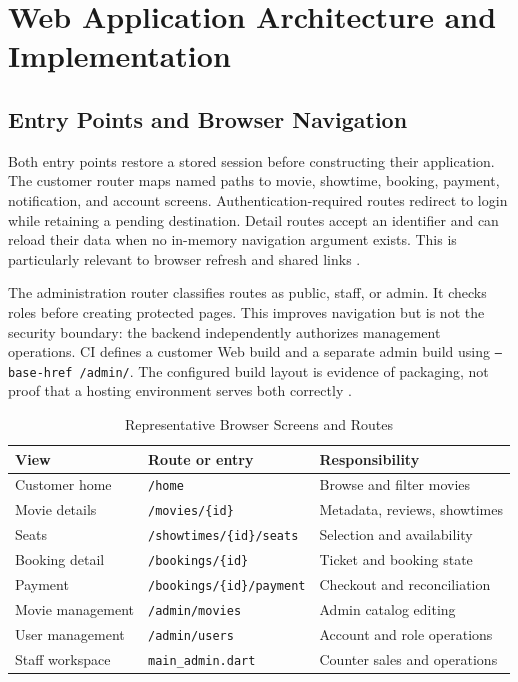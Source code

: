 \documentclass[conference]{IEEEtran}
\newcommand{\code}[1]{\texttt{#1}}
\begin{document}
\section{Web Application Architecture and Implementation}
\subsection{Entry Points and Browser Navigation}
Both entry points restore a stored session before constructing their application.
The customer router maps named paths to movie, showtime, booking, payment,
notification, and account screens. Authentication-required routes redirect to
login while retaining a pending destination. Detail routes accept an identifier
and can reload their data when no in-memory navigation argument exists.
This is particularly relevant to browser refresh and shared links
\cite{client}.

The administration router classifies routes as public, staff, or admin. It
checks roles before creating protected pages. This improves navigation but is
not the security boundary: the backend independently authorizes management
operations. CI defines a customer Web build and a separate admin build using
\code{--base-href /admin/}. The configured build layout is evidence of packaging,
not proof that a hosting environment serves both correctly \cite{client,tests}.

\begin{table}[t]
\caption{Representative Browser Screens and Routes}\label{tab:routes}
\centering\footnotesize
\begin{tabularx}{\columnwidth}{@{}lYY@{}}\toprule
\textbf{View} & \textbf{Route or entry} & \textbf{Responsibility}\\\midrule
Customer home & \code{/home} & Browse and filter movies\\
Movie details & \code{/movies/\{id\}} & Metadata, reviews, showtimes\\
Seats & \code{/showtimes/}\allowbreak\code{\{id\}/seats} & Selection and availability\\
Booking detail & \code{/bookings/\{id\}} & Ticket and booking state\\
Payment & \code{/bookings/}\allowbreak\code{\{id\}/payment} & Checkout and reconciliation\\
Movie management & \code{/admin/movies} & Admin catalog editing\\
User management & \code{/admin/users} & Account and role operations\\
Staff workspace & \code{main\_admin.dart} & Counter sales and operations\\\bottomrule
\end{tabularx}
\end{table}
\end{document}
